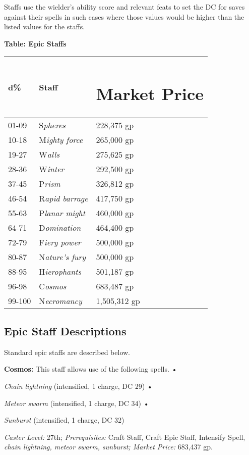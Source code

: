 \documentclass{article}
\begin{document}
Staffs use the wielder's ability score and relevant feats to set the DC for saves 
against their spells in such cases where those values would be higher than the 
listed values for the staffs. 

\vspace{12pt}
\textbf{Table: Epic Staffs }

\begin{tabular}{|>{\raggedright}p{28pt}|>{\raggedright}p{57pt}|>{\raggedright}p{55pt}|}
\hline
d\textbf{\%} & S\textbf{taff } & \section*{M\textbf{arket Price }}\tabularnewline
\hline
01-09 & S\textit{pheres} & 228,375 gp \tabularnewline
\hline
10-18 & M\textit{ighty force } & 265,000 gp \tabularnewline
\hline
19-27 & W\textit{alls } & 275,625 gp \tabularnewline
\hline
28-36 & W\textit{inter } & 292,500 gp \tabularnewline
\hline
37-45 & P\textit{rism } & 326,812 gp \tabularnewline
\hline
46-54 & R\textit{apid barrage } & 417,750 gp \tabularnewline
\hline
55-63 & P\textit{lanar might } & 460,000 gp \tabularnewline
\hline
64-71 & D\textit{omination } & 464,400 gp \tabularnewline
\hline
72-79 & F\textit{iery power } & 500,000 gp \tabularnewline
\hline
80-87 & N\textit{ature's fury } & 500,000 gp \tabularnewline
\hline
88-95 & H\textit{ierophants } & 501,187 gp \tabularnewline
\hline
96-98 & C\textit{osmos } & 683,487 gp \tabularnewline
\hline
99-100 & N\textit{ecromancy } & 1,505,312 gp\tabularnewline
\hline
\end{tabular}

\vspace{12pt}
\subsection*{Epic Staff Descriptions }

Standard epic staffs are described below. 

\vspace{12pt}
\textbf{Cosmos:  }This staff allows use of the following spells. • 

\parindent=3pt
\textit{Chain lightning }(intensified, 1 charge, DC 29) • 

\textit{Meteor swarm }(intensified, 1 charge, DC 34) • 

\textit{Sunburst }(intensified, 1 charge, DC 32) 

\parindent=0pt
\textit{Caster Level: }27th; \textit{Prerequisites: }Craft Staff, Craft Epic Staff, 
Intensify Spell, \textit{chain lightning, meteor swarm, sunburst; Market Price: 
}683,437 gp. 
\end{document}
